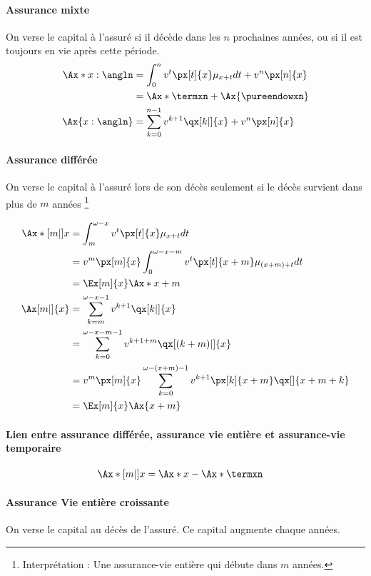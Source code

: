 \documentclass[10pt, french]{article}
\begin{document}
\begin{multicols*}{3}
\paragraph{Assurance mixte} On verse le capital à l'assuré si il décède dans les $n$ prochaines années, ou si il est toujours en vie après cette période.
\begin{align*}
\Ax*{x:\angln}	& = \int_{0}^{n} v^t \px[t]{x} \mu_{x+t} dt + v^n \px[n]{x} \\
	& = \Ax*{\termxn} + \Ax{\pureendowxn} \\
\Ax{x:\angln}		& = \sum_{k=0}^{n-1} v^{k+1} \qx[k|]{x} + v^n \px[n]{x} \\
\end{align*}

\paragraph{Assurance différée} On verse le capital à l'assuré lors de son décès seulement si le décès survient dans plus de $m$ années \footnote{Interprétation : Une assurance-vie entière qui débute dans $m$ années.}

\begin{align*}
\Ax*[m|]{x}	& = \int_{m}^{\omega -x} v^t \px[t]{x} \mu_{x+t} dt \\
	& = v^m \px[m]{x} \int_{0}^{\omega - x - m} v^t \px[t]{x+m} \mu_{(x+m)+t} dt \\
	& = \Ex[m]{x} \Ax*{x+m} \\
\Ax[m|]{x}	& = \sum_{k=m}^{\omega - x -1} v^{k+1} \qx[k|]{x} \\
	& = \sum_{k=0}^{\omega - x - m - 1} v^{k+1+m} \qx[(k+m)|]{x} \\
	& = v^m \px[m]{x} \sum_{k=0}^{\omega - (x+m) - 1} v^{k+1} \px[k]{x+m} \qx[]{x+m+k} \\
	& = \Ex[m]{x} \Ax{x+m} \\
\end{align*}
\paragraph{Lien entre assurance différée, assurance vie entière et assurance-vie temporaire}

\begin{align*}
\Ax*[m|]{x}	& = \Ax*{x} - \Ax*{\termxn}
\end{align*}

\paragraph{Assurance Vie entière croissante} On verse le capital au décès de l'assuré. Ce capital augmente chaque années.


\end{multicols*}
\end{document}
